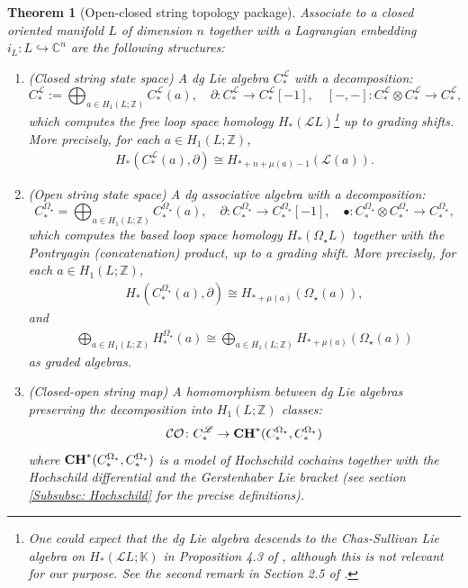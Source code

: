 \documentclass[10pt]{amsart}
\numberwithin{equation}{section}
\theoremstyle{plain}
\newtheorem{theorem}{Theorem}[section]
\theoremstyle{definition}
\theoremstyle{remark}
\numberwithin{equation}{section}
\newcommand{\Z}{\mathbb{Z}}
\newcommand{\C}{\mathbb{C}}
\newcommand{\K}{\mathbb{K}}
\newcommand{\ms}[1]{\mathscr{#1}}
\newcommand{\CO}{\mathcal{CO}}
\newcommand{\CC}{\textbf{\textup{CH}}}
\newcommand{\CFr}{C_*^\mathscr{L}}
\newcommand{\CBa}{C_*^{\Omega_\star}}
\newcommand{\HBa}{H_*^{\Omega_\star}}
\newcommand{\Cfr}[1]{C_{#1}^\mathscr{L}}
\begin{document}
{\begin{theorem}[Open-closed string topology package]
\label{Thm: OCstringPackage}
	Associate to a closed oriented manifold $L$ of dimension $n$ together with a Lagrangian embedding $i_L\colon L\hookrightarrow \C^n$ are the following structures: 
	\begin{enumerate}
		\item (Closed string state space) A dg Lie algebra $\CFr$ with a decomposition: \[ \CFr:= \bigoplus_{a\in H_1(L;\Z)} \CFr(a),\quad \partial \colon \Cfr{*} \to \Cfr{*}[-1],\quad   [-,-]\colon \CFr\otimes \CFr\to \CFr,\]which computes the free loop space homology $H_*(\mathscr{L}L)$\footnote{One could expect that the dg Lie algebra descends to the Chas-Sullivan Lie algebra on $H_*(\ms{L}L;\K)$ in Proposition 4.3 of \cite{ChasSullivan}, although this is not relevant for our purpose. See the second remark in Section 2.5 of \cite{WangThesis}.} up to grading shifts. More precisely, for each $a\in H_1(L;\Z)$, 
		\begin{align*}
			H_*(\CFr(a),\partial)\cong  H_{*+ n + \mu(a) - 1}(\ms{L}(a)).
		\end{align*}
		\item (Open string state space) A dg  associative algebra with a decomposition: \[C_*^{\Omega_\star} = \bigoplus_{a\in H_1(L;\Z)} C_*^{\Omega_\star}(a), \quad \partial\colon C_*^{\Omega_\star} \to C_*^{\Omega_\star}[-1], \quad \bullet\colon C_*^{\Omega_\star}\otimes C_*^{\Omega_\star}\to \CBa,\]which computes the based loop space homology $H_*(\Omega_\star L)$  together with the Pontryagin (concatenation) product, up to a grading shift. More precisely, for each $a\in H_1(L;\Z)$, 
		\begin{align*}
			H_*(\CBa(a),\partial) \cong H_{*+\mu(a)}(\Omega_\star (a)),
		\end{align*}
		and 
		\begin{align*}					\bigoplus_{a\in H_1(L;\Z)} \HBa(a) \cong \bigoplus_{a\in H_1(L;\Z)} H_{*+\mu(a)}(\Omega_\star(a))
		\end{align*}
		as graded algebras.
		\item (Closed-open string map) A homomorphism between dg Lie algebras preserving the decomposition into $H_1(L;\Z)$ classes: \[ \CO\colon \CFr\to \CC^*(\CBa, \CBa) \]
		where $\CC^*(\CBa,\CBa)$ is a model of Hochschild cochains together with the Hochschild differential and the Gerstenhaber Lie bracket (see section \ref{Subsubsc: Hochschild} for the precise definitions).
	\end{enumerate}
\end{theorem}


}
\end{document}
